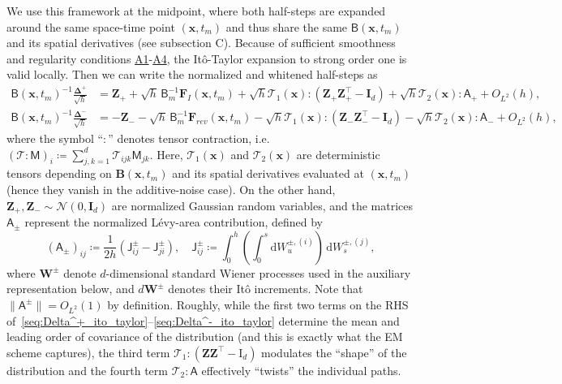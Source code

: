 \documentclass[
 longbibliography,
 twocolumn,
 superscriptaddress,
 amsmath,
 amssymb,
 amsthm,
 amsfonts,
 prl,
 floatfix,
]{revtex4-2}
\newcommand{\matbf}[1]{\boldsymbol{\mathsf{#1}}}
\begin{document}
\begin{widetext}
We use this framework at the midpoint, where both half-steps are expanded around the same space-time point $(\bm{x},t_m)$ and thus share the same $\matbf{B}(\bm{x},t_m)$ and its spatial derivatives (see subsection C). Because of sufficient smoothness and regularity conditions \hyperlink{assumption:A1}{A1}-\hyperlink{assumption:A4}{A4}, the It\^{o}-Taylor expansion to strong order one is valid locally. Then we can write the normalized and whitened half-steps as
\begin{align}
    \matbf{B}(\bm{x},t_m)^{-1}\frac{\bm\Delta^+}{\sqrt{h}}
        &=\bm{Z}_++\sqrt{h}\,\matbf{B}_m^{-1}\bm{F}_I(\bm{x},t_m)
        +\sqrt{h}\mathcal{T}_1(\bm{x}):\left(\bm{Z}_+\bm{Z}_+^\intercal-\mathbf{I}_d\right)
        +\sqrt{h}\mathcal{T}_2(\bm{x}):\matbf{A}_+
        +O_{L^2}(h),
        \label{seq:Delta^+_ito_taylor}
        \\
        \matbf{B}(\bm{x},t_m)^{-1}\frac{\bm\Delta^-}{\sqrt{h}}
        &=-\bm{Z}_--\sqrt{h}\,\matbf{B}_m^{-1}\bm{F}_{rev}(\bm{x},t_m)
        -\sqrt{h}\mathcal{T}_1(\bm{x}):\left(\bm{Z}_-\bm{Z}_-^\intercal-\mathbf{I}_d\right)
        -\sqrt{h}\mathcal{T}_2(\bm{x}):\matbf{A}_-
        +O_{L^2}(h),
    \label{seq:Delta^-_ito_taylor}
\end{align}
where the symbol ``$:$'' denotes tensor contraction, i.e.
$(\mathcal{T}:\matbf{M})_i\coloneq\sum_{j,k=1}^d\mathcal{T}_{ijk}\matbf{M}_{jk}$.
Here, $\mathcal{T}_1(\bm{x})$ and $\mathcal{T}_2(\bm{x})$ are deterministic tensors depending on
$\mathbf{B}(\bm{x},t_m)$ and its spatial derivatives evaluated at $(\bm{x},t_m)$ (hence they vanish in the additive-noise case).
On the other hand, $\bm{Z}_+,\bm{Z}_-\sim\mathcal{N}(0,\mathbf{I}_d)$ are normalized Gaussian random variables,
and the matrices $\matbf{A}_{\pm}$ represent the normalized  L\'{e}vy-area contribution, defined by
\begin{equation}
    (\matbf{A}_{\pm})_{ij}\coloneq
    \frac{1}{2h}\left(\matbf{J}^{\pm}_{ij}-\matbf{J}^{\pm}_{ji}\right),
    \quad
    \matbf{J}^{\pm}_{ij}\coloneq
    \int_0^h \left(\int_0^s \mathrm{d}W^{\pm,(i)}_u\right)\, \mathrm{d}W^{\pm,(j)}_s,
    \label{seq:def_levy_area_matrix}
\end{equation}
where $\bm{W}^\pm$ denote $d$-dimensional standard Wiener processes used in the auxiliary representation below,
and $d\bm{W}^\pm$ denotes their It\^o increments. Note that $\|\matbf{A}^\pm\|=O_{L^2}(1)$ by definition.
Roughly, while the first two terms on the RHS of~\eqref{seq:Delta^+_ito_taylor}--\eqref{seq:Delta^-_ito_taylor} determine the mean and leading order of covariance of the distribution (and this is exactly what the EM scheme captures), the third term $\mathcal{T}_1:(\bm{Z}\bm{Z}^\intercal-\mathrm{I}_d)$ modulates the ``shape'' of the distribution and the fourth term $\mathcal{T}_2:\matbf{A}$ effectively ``twists'' the individual paths.


\end{widetext}
\end{document}
